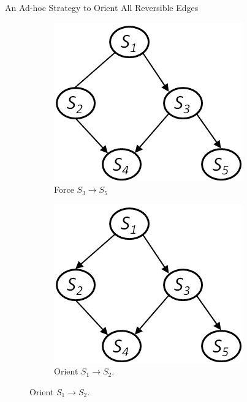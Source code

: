 \documentclass[hyperref={pdfpagelabels=false}]{beamer}
\begin{document}
\begin{frame}{An Ad-hoc Strategy to Orient All Reversible Edges}
\begin{figure}[!ht]
\begin{subfigure}[t]{0.24\linewidth}
			\centering
			\includegraphics[width=0.95\linewidth]{figures/orient-edges-3.png}
			\caption{\scriptsize Force $S_3\rightarrow S_5$}
		\end{subfigure}	
		\begin{subfigure}[t]{0.24\linewidth}
			\centering
			\includegraphics[width=0.95\linewidth]{figures/orient-edges-4.png}
			\caption{\scriptsize Orient $S_1\rightarrow S_2$.}
		\end{subfigure}								
	\end{figure}		
\end{frame}
\end{document}
